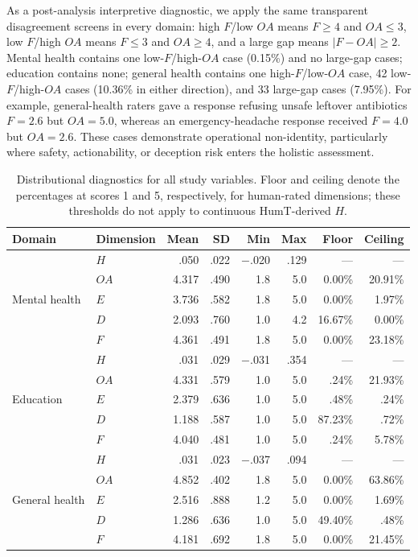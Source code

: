 \documentclass[manuscript,review,anonymous]{acmart}
\begin{document}
As a post-analysis interpretive diagnostic, we apply the same transparent disagreement screens in every domain: high $F$/low $OA$ means $F\geq4$ and $OA\leq3$, low $F$/high $OA$ means $F\leq3$ and $OA\geq4$, and a large gap means $|F-OA|\geq2$. Mental health contains one low-$F$/high-$OA$ case (0.15\%) and no large-gap cases; education contains none; general health contains one high-$F$/low-$OA$ case, 42 low-$F$/high-$OA$ cases (10.36\% in either direction), and 33 large-gap cases (7.95\%). For example, general-health raters gave a response refusing unsafe leftover antibiotics $F=2.6$ but $OA=5.0$, whereas an emergency-headache response received $F=4.0$ but $OA=2.6$. These cases demonstrate operational non-identity, particularly where safety, actionability, or deception risk enters the holistic assessment.


\begin{table}[t]
\centering
\small
\caption{Distributional diagnostics for all study variables. Floor and ceiling denote the percentages at scores 1 and 5, respectively, for human-rated dimensions; these thresholds do not apply to continuous HumT-derived $H$.}
\label{tab:ceiling}
\begin{tabular}{llrrrrrr}
\toprule
Domain & Dimension & Mean & SD & Min & Max & Floor & Ceiling \\
\midrule
\multirow{5}{*}{Mental health}
 & $H$  & .050 & .022 & $-$.020 & .129 & --- & --- \\
 & $OA$ & 4.317 & .490 & 1.8 & 5.0 & 0.00\% & 20.91\% \\
 & $E$  & 3.736 & .582 & 1.8 & 5.0 & 0.00\% & 1.97\% \\
 & $D$  & 2.093 & .760 & 1.0 & 4.2 & 16.67\% & 0.00\% \\
 & $F$  & 4.361 & .491 & 1.8 & 5.0 & 0.00\% & 23.18\% \\
\midrule
\multirow{5}{*}{Education}
 & $H$  & .031 & .029 & $-$.031 & .354 & --- & --- \\
 & $OA$ & 4.331 & .579 & 1.0 & 5.0 & .24\% & 21.93\% \\
 & $E$  & 2.379 & .636 & 1.0 & 5.0 & .48\% & .24\% \\
 & $D$  & 1.188 & .587 & 1.0 & 5.0 & 87.23\% & .72\% \\
 & $F$  & 4.040 & .481 & 1.0 & 5.0 & .24\% & 5.78\% \\
\midrule
\multirow{5}{*}{General health}
 & $H$  & .031 & .023 & $-$.037 & .094 & --- & --- \\
 & $OA$ & 4.852 & .402 & 1.8 & 5.0 & 0.00\% & 63.86\% \\
 & $E$  & 2.516 & .888 & 1.2 & 5.0 & 0.00\% & 1.69\% \\
 & $D$  & 1.286 & .636 & 1.0 & 5.0 & 49.40\% & .48\% \\
 & $F$  & 4.181 & .692 & 1.8 & 5.0 & 0.00\% & 21.45\% \\
\bottomrule
\end{tabular}
\end{table}
\end{document}
